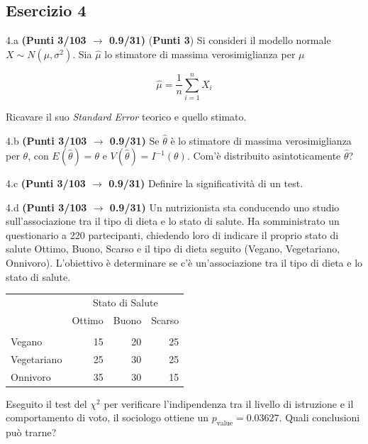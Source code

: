 \documentclass[
  11pt,
]{book}
\theoremstyle{mytheoremstyle}
\theoremstyle{mydefstyle}
\begin{document}
\subsection{Esercizio 4}\label{esercizio-4-36}

4.a \textbf{(Punti 3/103 \(\rightarrow\) 0.9/31)} (\textbf{Punti 3}) Si consideri il modello normale \(X\sim N(\mu,\sigma^2)\). Sia \(\hat\mu\) lo stimatore di massima verosimiglianza per \(\mu\)

\[
  \hat\mu = \frac 1n \sum_{i=1}^n X_i
\]

Ricavare il suo \emph{Standard Error} teorico e quello stimato.

4.b \textbf{(Punti 3/103 \(\rightarrow\) 0.9/31)} Se \(\hat\theta\) è lo stimatore di massima verosimiglianza
per \(\theta\), con \(E(\hat\theta)=\theta\) e \(V(\hat\theta)=I^{-1}(\theta)\).
Com'è distribuito asintoticamente \(\hat\theta\)?

4.c \textbf{(Punti 3/103 \(\rightarrow\) 0.9/31)} Definire la significatività di un test.

4.d \textbf{(Punti 3/103 \(\rightarrow\) 0.9/31)} Un nutrizionista sta conducendo uno studio sull'associazione tra il tipo di dieta e lo stato di salute. Ha somministrato un questionario a 220 partecipanti, chiedendo loro di indicare il proprio stato di salute Ottimo, Buono, Scarso e il tipo di dieta seguito (Vegano, Vegetariano, Onnivoro). L'obiettivo è determinare se c'è un'associazione tra il tipo di dieta e lo stato di salute.

\begin{table}[H]
\centering\centering\centering
\begin{tabular}{lrrr}
\toprule
\multicolumn{1}{c}{ } & \multicolumn{3}{c}{Stato di Salute} \\
\cmidrule(l{3pt}r{3pt}){2-4}
  & Ottimo & Buono & Scarso\\
\midrule
\addlinespace[0.3em]
\multicolumn{4}{l}{\textbf{Tipo di Dieta}}\\
\hspace{1em}Vegano & 15 & 20 & 25\\
\hspace{1em}Vegetariano & 25 & 30 & 25\\
\hspace{1em}Onnivoro & 35 & 30 & 15\\
\bottomrule
\end{tabular}
\end{table}

Eseguito il test del \(\chi^2\) per verificare l'indipendenza tra il livello di istruzione e il comportamento di voto, il sociologo ottiene un \(p_\text{value}=0.03627\). Quali conclusioni può trarne?
\end{document}

